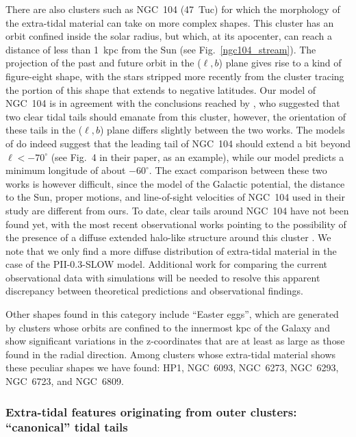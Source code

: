             There are also clusters such as NGC~104 (47~Tuc) for which the morphology of the extra-tidal material can take on more complex shapes. This cluster has an orbit confined inside the solar radius, but which, at its apocenter, can reach a distance of less than 1~kpc from the Sun (see Fig.~\ref{ngc104_stream}). The projection of the past and future orbit in the ($\ell, b$) plane gives rise to a kind of figure-eight shape, with the stars stripped more recently from the cluster tracing the portion of this shape that extends to negative latitudes. Our model of NGC~104 is in agreement with the conclusions reached by \citet{2012MNRAS.423.2845L}, who suggested that two clear tidal tails should emanate from this cluster, however, the orientation of these tails in the ($\ell, b$) plane differs slightly between the two works. The models of \citet{2012MNRAS.423.2845L} do indeed suggest that the leading tail of NGC~104 should extend a bit beyond $\ell < -70^\circ$ (see Fig.~4 in their paper, as an example), while our model predicts a minimum longitude of about $-60^\circ$. The exact comparison between these two works is however difficult, since the model of the Galactic potential, the distance to the Sun, proper motions, and line-of-sight velocities of NGC~104 used in their study are different from ours. To date, clear tails around NGC~104 have not been found yet, with the most recent observational works pointing to the possibility of the presence of a diffuse extended halo-like structure around this cluster \citep[see][]{2017ApJ...846L..10P}. We note that we only find a more diffuse distribution of extra-tidal material in the case of the PII-0.3-SLOW model. Additional work for comparing the current observational data with simulations will be needed to resolve this apparent discrepancy between theoretical predictions and observational findings. 

            Other shapes found in this category include ``Easter eggs'', which are generated by clusters whose orbits are confined to the innermost kpc of the Galaxy and show significant variations in the z-coordinates that are at least as large as those found in the radial direction. Among clusters whose extra-tidal material shows these peculiar shapes we have found: HP1, NGC~6093, NGC~6273, NGC~6293, NGC~6723, and NGC~6809.

        \subsubsection{Extra-tidal features originating from outer clusters: ``canonical'' tidal tails}

